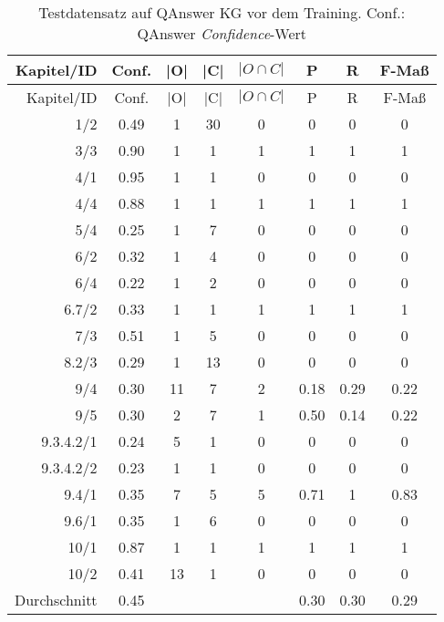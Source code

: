 \begin{longtable}{r c c c c c c c}
  \caption[Testdatensatz QAnswer vor Training]{Testdatensatz auf QAnswer KG vor dem Training.
  Conf.: QAnswer \emph{Confidence}-Wert}
  \label{tab:qanswervortraining}
  \\
  \toprule
  Kapitel/ID    & Conf. & |O|   & |C|   & $|O \cap C|$  & P     & R     & F-Maß   \\
  \midrule
  \endfirsthead
  \toprule
  Kapitel/ID    & Conf. & |O|   & |C|   & $|O \cap C|$  & P     & R     & F-Maß   \\
  \midrule
  \endhead
  1/2           & 0.49  & 1     & 30    & 0             & 0     & 0     & 0       \\
  3/3           & 0.90  & 1     & 1     & 1             & 1     & 1     & 1       \\
  4/1           & 0.95  & 1     & 1     & 0             & 0     & 0     & 0       \\
  4/4           & 0.88  & 1     & 1     & 1             & 1     & 1     & 1       \\
  5/4           & 0.25  & 1     & 7     & 0             & 0     & 0     & 0       \\
  6/2           & 0.32  & 1     & 4     & 0             & 0     & 0     & 0       \\
  6/4           & 0.22  & 1     & 2     & 0             & 0     & 0     & 0       \\
  6.7/2         & 0.33  & 1     & 1     & 1             & 1     & 1     & 1       \\
  7/3           & 0.51  & 1     & 5     & 0             & 0     & 0     & 0       \\
  8.2/3         & 0.29  & 1     & 13    & 0             & 0     & 0     & 0       \\
  9/4           & 0.30  & 11    & 7     & 2             & 0.18  & 0.29  & 0.22    \\
  9/5           & 0.30  & 2     & 7     & 1             & 0.50  & 0.14  & 0.22    \\
  9.3.4.2/1     & 0.24  & 5     & 1     & 0             & 0     & 0     & 0       \\
  9.3.4.2/2     & 0.23  & 1     & 1     & 0             & 0     & 0     & 0       \\
  9.4/1         & 0.35  & 7     & 5     & 5             & 0.71  & 1     & 0.83    \\
  9.6/1         & 0.35  & 1     & 6     & 0             & 0     & 0     & 0       \\
  10/1          & 0.87  & 1     & 1     & 1             & 1     & 1     & 1       \\
  10/2          & 0.41  & 13    & 1     & 0             & 0     & 0     & 0       \\
  \midrule
  Durchschnitt  & 0.45  &       &       &               & 0.30  & 0.30  & 0.29    \\
  \bottomrule
\end{longtable}


